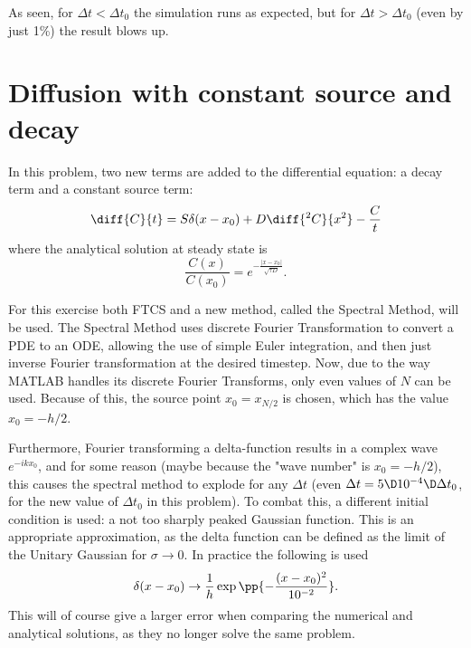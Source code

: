 \documentclass[a4paper,10pt]{article} 	%
\numberwithin{equation}{section}
\begin{document}
	As seen, for $ \Delta t < \Delta t_0 $ the simulation runs as expected, but for $ \Delta t > \Delta t_0 $ (even by just 1\%) the result blows up.



	\section{Diffusion with constant source and decay}
	In this problem, two new terms are added to the differential equation: a decay term and a constant source term:
	\begin{equation}\label{key}
		\diff{C}{t} = S \delta(x-x_0) + D \diff{^2 C}{x^2}- \frac{C}{t}
	\end{equation}
	where the analytical solution at steady state is
	\begin{equation}\label{key}
		\frac{C(x)}{C(x_0)} = e^{-\frac{|x-x_0|}{\sqrt{\tau D}}}.
	\end{equation}
	
	For this exercise both FTCS and a new method, called the Spectral Method, will be used. The Spectral Method uses discrete Fourier Transformation to convert a PDE to an ODE, allowing the use of simple Euler integration, and then just inverse Fourier transformation at the desired timestep. Now, due to the way MATLAB handles its discrete Fourier Transforms, only even values of $ N $ can be used. Because of this, the source point $ x_0 = x_{N/2} $ is chosen, which has the value $ x_0 = -h/2 $.
	
	Furthermore, Fourier transforming a delta-function results in a complex wave $ e^{-ikx_0} $, and for some reason (maybe because the "wave number" is $ x_0 = -h/2 $), this causes the spectral method to explode for any $ \Delta t $ (even $ \Delta t = 5\D10^{-4}\D \Delta t_0 $, for the new value of $ \Delta t_0$ in this problem). To combat this, a different initial condition is used: a not too sharply peaked Gaussian function. This is an appropriate approximation, as the delta function can be defined as the limit of the Unitary Gaussian for $ \sigma \to 0 $. In practice the following is used
	\begin{equation}\label{key}
		\delta (x-x_0) \to \frac{1}{h} \exp\pp{-\frac{(x-x_0)^2}{10^{-2}}}.
	\end{equation} 
	This will of course give a larger error when comparing the numerical and analytical solutions, as they no longer solve the same problem.
	
\end{document}
